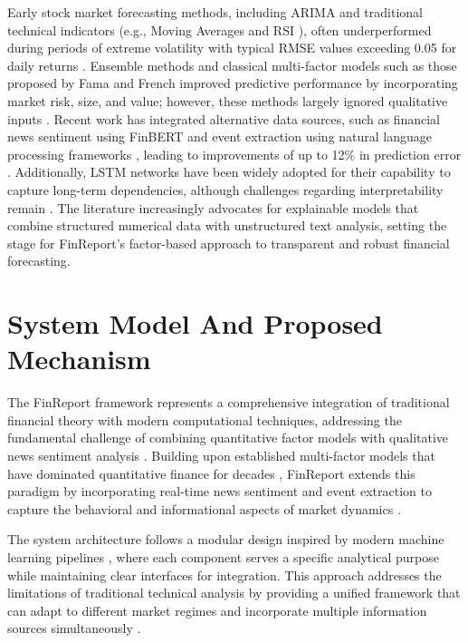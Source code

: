 \documentclass[3p,times,procedia]{elsarticle}
\begin{document}
Early stock market forecasting methods, including ARIMA \cite{Box1970} and traditional technical indicators (e.g., Moving Averages and RSI \cite{Wilder1978}), often underperformed during periods of extreme volatility with typical RMSE values exceeding 0.05 for daily returns \cite{Poon2003}. Ensemble methods and classical multi-factor models such as those proposed by Fama and French \cite{FAMA1993} improved predictive performance by incorporating market risk, size, and value; however, these methods largely ignored qualitative inputs \cite{Malkiel2003}. Recent work has integrated alternative data sources, such as financial news sentiment using FinBERT \cite{Araci2019} and event extraction using natural language processing frameworks \cite{Loughran2011}, leading to improvements of up to 12\% in prediction error \cite{Ding2015}. Additionally, LSTM networks \cite{hochreiter1997lstm,Fischer2018} have been widely adopted for their capability to capture long-term dependencies, although challenges regarding interpretability remain \cite{Ribeiro2016}. The literature increasingly advocates for explainable models that combine structured numerical data with unstructured text analysis, setting the stage for FinReport’s factor-based approach to transparent and robust financial forecasting.

\section{System Model And Proposed Mechanism}

The FinReport framework represents a comprehensive integration of traditional financial theory with modern computational techniques, addressing the fundamental challenge of combining quantitative factor models \cite{FAMA1993,Carhart1997} with qualitative news sentiment analysis \cite{TETLOCK2007,Xing2018}. Building upon established multi-factor models that have dominated quantitative finance for decades \cite{Banz1981,Rosenberg1985}, FinReport extends this paradigm by incorporating real-time news sentiment and event extraction to capture the behavioral and informational aspects of market dynamics \cite{Daniel1998,Campbell2001}.

The system architecture follows a modular design inspired by modern machine learning pipelines \cite{Fischer2018}, where each component serves a specific analytical purpose while maintaining clear interfaces for integration. This approach addresses the limitations of traditional technical analysis \cite{Murphy1999,Wilder1978} by providing a unified framework that can adapt to different market regimes and incorporate multiple information sources simultaneously \cite{Lo2004}.
\end{document}
